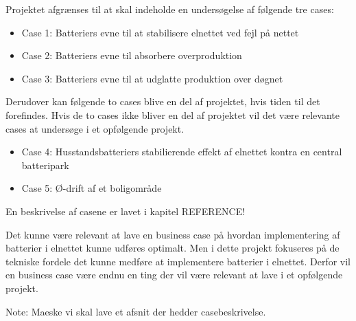 
\label{Afgraensning}

Projektet afgrænses til at skal indeholde en undersøgelse af følgende tre cases:

\begin{itemize}
	\item Case 1: Batteriers evne til at stabilisere elnettet ved fejl på nettet
	\item Case 2: Batteriers evne til absorbere overproduktion
	\item Case 3: Batteriers evne til at udglatte produktion over døgnet
\end{itemize}	
	
Derudover kan følgende to cases blive en del af projektet, hvis tiden til det forefindes. Hvis de to cases ikke bliver en del af projektet vil det være relevante cases at undersøge i et opfølgende projekt.

\begin{itemize}
	\item Case 4: Husstandsbatteriers stabilierende effekt af elnettet kontra en central batteripark
	\item Case 5: Ø-drift af et boligområde
\end{itemize}

En beskrivelse af casene er lavet i kapitel REFERENCE!

Det kunne være relevant at lave en business case på hvordan implementering af batterier i elnettet kunne udføres optimalt. Men i dette projekt fokuseres på de tekniske fordele det kunne medføre at implementere batterier i elnettet. Derfor vil en business case være endnu en ting der vil være relevant at lave i et opfølgende projekt.

Note: Maeske vi skal lave et afsnit der hedder casebeskrivelse.
